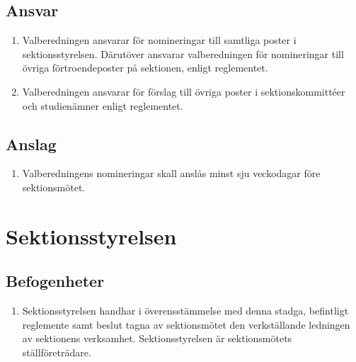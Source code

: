 \documentclass[11pt,a4paper]{article}
\begin{document}
\subsection{Ansvar}

\begin{enumerate}[\thesubsection .1]

  \item Valberedningen ansvarar för nomineringar till samtliga poster
  i sektionsstyrelsen. Därutöver ansvarar valberedningen för
  nomineringar till övriga förtroendeposter på sektionen, enligt
  reglementet.
  
  \item Valberedningen ansvarar för förslag till övriga poster i sektionskommittéer och studienämner enligt reglementet.

\end{enumerate}

\subsection{Anslag}

\begin{enumerate}[\thesubsection .1]

  \item Valberedningens nomineringar skall anslås minst sju veckodagar före sektionsmötet.

\end{enumerate}


\newpage




\section{Sektionsstyrelsen}
\label{sektionsstyrelsen}
\subsection{Befogenheter}

\begin{enumerate}[\thesubsection .1]

  \item Sektionsstyrelsen handhar i överens\-stäm\-melse med denna stadga, befintligt reglemente samt beslut tagna av sektionsmötet den verk\-ställ\-ande ledningen av sektionens verksamhet. Sektionsstyrelsen är sektions\-mötets ställ\-före\-trädare.

\end{enumerate}
\end{document}
